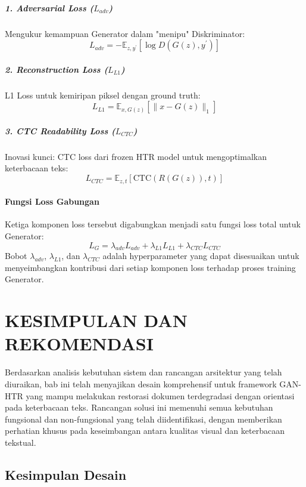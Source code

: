\documentclass[12pt,a4paper]{article}
\begin{document}
\subparagraph{1. Adversarial Loss ($L_{adv}$)}
Mengukur kemampuan Generator dalam "menipu" Diskriminator:
\begin{equation}
L_{adv} = -\mathbb{E}_{z,y^{\prime}}[\log D(G(z), y^{\prime})]
\end{equation}

\subparagraph{2. Reconstruction Loss ($L_{L1}$)}
L1 Loss untuk kemiripan piksel dengan ground truth:
\begin{equation}
L_{L1} = \mathbb{E}_{x,G(z)}[\|x - G(z)\|_1]
\end{equation}

\subparagraph{3. CTC Readability Loss ($L_{CTC}$)}
Inovasi kunci: CTC loss dari frozen HTR model untuk mengoptimalkan keterbacaan teks:
\begin{equation}
L_{CTC} = \mathbb{E}_{z,t}[\text{CTC}(R(G(z)), t)]
\end{equation}

\paragraph{Fungsi Loss Gabungan}
Ketiga komponen loss tersebut digabungkan menjadi satu fungsi loss total untuk Generator:
\begin{equation}
L_G = \lambda_{adv} L_{adv} + \lambda_{L1} L_{L1} + \lambda_{CTC} L_{CTC}
\end{equation}
Bobot $\lambda_{adv}$, $\lambda_{L1}$, dan $\lambda_{CTC}$ adalah hyperparameter yang dapat disesuaikan untuk menyeimbangkan kontribusi dari setiap komponen loss terhadap proses training Generator.

\section{KESIMPULAN DAN REKOMENDASI}
\label{sec:kesimpulan}

Berdasarkan analisis kebutuhan sistem dan rancangan arsitektur yang telah diuraikan, bab ini telah menyajikan desain komprehensif untuk framework GAN-HTR yang mampu melakukan restorasi dokumen terdegradasi dengan orientasi pada keterbacaan teks. Rancangan solusi ini memenuhi semua kebutuhan fungsional dan non-fungsional yang telah diidentifikasi, dengan memberikan perhatian khusus pada keseimbangan antara kualitas visual dan keterbacaan tekstual.

\subsection{Kesimpulan Desain}
\end{document}
